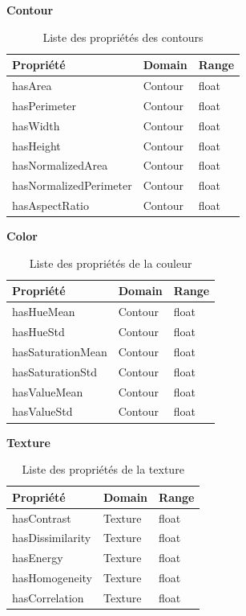 \FloatBarrier

\noindent\textbf{Contour}
\begin{table}[H]
	\centering
	\begin{tabular}{|p{5cm}|p{5cm}|p{5cm}|}
		\hline
		\textbf{Propriété} & \textbf{Domain} & \textbf{Range} \\
		\hline
		hasArea & Contour & float \\
		\hline
		hasPerimeter & Contour & float \\
		\hline
		hasWidth & Contour & float \\
		\hline
		hasHeight & Contour & float \\
		\hline
		hasNormalizedArea & Contour & float \\
		\hline
		hasNormalizedPerimeter & Contour & float \\
		\hline
		hasAspectRatio & Contour & float \\
		\hline
	\end{tabular}
	\caption{Liste des propriétés des contours}
\end{table}

\FloatBarrier

\noindent\textbf{Color}
\begin{table}[H]
	\centering
	\begin{tabular}{|p{5cm}|p{5cm}|p{5cm}|}
		\hline
		\textbf{Propriété} & \textbf{Domain} & \textbf{Range} \\
		\hline
		hasHueMean & Contour & float \\
		\hline
		hasHueStd & Contour & float \\
		\hline
		hasSaturationMean & Contour & float \\
		\hline
		hasSaturationStd & Contour & float \\
		\hline
		hasValueMean & Contour & float \\
		\hline
		hasValueStd & Contour & float \\
		\hline
	\end{tabular}
	\caption{Liste des propriétés de la couleur}
\end{table}

\FloatBarrier

\noindent\textbf{Texture}
\begin{table}[H]
	\centering
	\begin{tabular}{|p{5cm}|p{5cm}|p{5cm}|}
		\hline
		\textbf{Propriété} & \textbf{Domain} & \textbf{Range} \\
		\hline
		hasContrast & Texture & float \\
		\hline
		hasDissimilarity & Texture & float \\
		\hline
		hasEnergy & Texture & float \\
		\hline
		hasHomogeneity & Texture & float \\
		\hline
		hasCorrelation & Texture & float \\
		\hline
	\end{tabular}
	\caption{Liste des propriétés de la texture}
\end{table}

